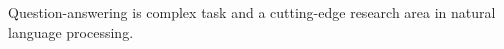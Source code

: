 \documentclass[11pt,letterpaper]{article}
\begin{document}
Question-answering is complex task and a cutting-edge research area
in natural language processing. 



%
%

%
 

%
\end{document}
